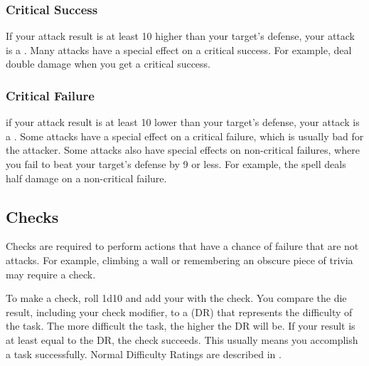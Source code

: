        \subsubsection{Critical Success}
            If your attack result is at least 10 higher than your target's defense, your attack is a .
            Many attacks have a special effect on a critical success.
            For example,  deal double damage when you get a critical success.

        \subsubsection{Critical Failure}
            if your attack result is at least 10 lower than your target's defense, your attack is a .
            Some attacks have a special effect on a critical failure, which is usually bad for the attacker.
            Some attacks also have special effects on non-critical failures, where you fail to beat your target's defense by 9 or less.
            For example, the  spell deals half damage on a non-critical failure.

    \subsection{Checks}
        Checks are required to perform actions that have a chance of failure that are not attacks.
        For example, climbing a wall or remembering an obscure piece of trivia may require a check.

        To make a check, roll 1d10 and add your  with the check.
        You compare the die result, including your check modifier, to a  (DR) that represents the difficulty of the task.
        The more difficult the task, the higher the DR will be.
        If your result is at least equal to the DR, the check succeeds.
        This usually means you accomplish a task successfully.
        Normal Difficulty Ratings are described in .

